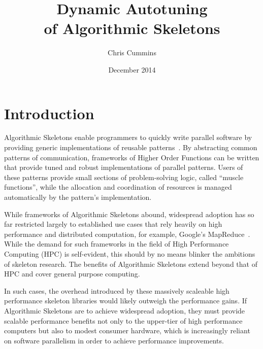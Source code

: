 
\author{Chris Cummins}

\date{December 2014}

\title{Dynamic Autotuning\\of Algorithmic Skeletons}

\newcommand{\subtitle}{MSc Research Proposal}

\newcommand{\degreeTitle}{MSc by Research\\ Pervasive Parallelism}

\newcommand{\institution}{School of Informatics,\\
  The University of Edinburgh}



\section{Introduction}
Algorithmic Skeletons enable programmers to quickly write parallel
software by providing generic implementations of reusable
patterns~\cite{Cole1989, Cole2004}. By abstracting common patterns of
communication, frameworks of Higher Order Functions can be written
that provide tuned and robust implementations of parallel
patterns. Users of these patterns provide small sections of
problem-solving logic, called ``muscle functions'', while the
allocation and coordination of resources is managed automatically by
the pattern's implementation.

While frameworks of Algorithmic Skeletons abound, widespread adoption
has so far restricted largely to established use cases that rely
heavily on high performance and distributed computation, for example,
Google's MapReduce~\cite{Dean2008}. While the demand for such
frameworks in the field of High Performance Computing (HPC) is
self-evident, this should by no means blinker the ambitions of
skeleton research. The benefits of Algorithmic Skeletons extend beyond
that of HPC and cover general purpose computing.

In such cases, the overhead introduced by these massively scaleable
high performance skeleton libraries would likely outweigh the
performance gains. If Algorithmic Skeletons are to achieve widespread
adoption, they must provide scalable performance benefits not only to
the upper-tier of high performance computers but also to modest
consumer hardware, which is increasingly reliant on software
parallelism in order to achieve performance improvements.


